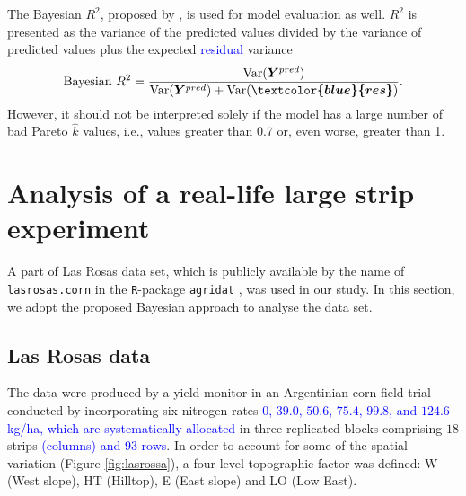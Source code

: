 \documentclass[a4paper]{article}   	%
\newcommand{\Var}{\mathrm{Var}}
\newcommand{\R}{\texttt{R}}
\begin{document}
	
	
	
	
	
	The Bayesian $R^2$, proposed by \textcite{Gelman2019Rsquared}, is used for model evaluation as well. $R^2$ is presented as the variance of the predicted values divided by the variance of predicted values plus the expected \textcolor{blue}{residual} variance 
	\begin{eqnarray}
		\mbox{Bayesian } R^2 = \frac{\Var(\bm{Y}^{pred})}{\Var (\bm{Y}^{pred})+\Var(\bm{\textcolor{blue}{res}})}.
	\end{eqnarray}
	However, it should not be interpreted solely if the model has a large number of bad Pareto $\hat{k}$ values, i.e., values greater than 0.7 or, even worse, greater than 1. 
	
	
	
	\section{Analysis of a real-life large strip experiment}\label{sec:analysis}
	
	A part of Las Rosas data set, which is publicly available by the name of \texttt{lasrosas.corn} in the \R-package \texttt{agridat} \parencite{Edmondson2014Agridat}, was used in our study. In this section, we adopt the proposed Bayesian approach to analyse the data set. 
	
	
	\subsection{Las Rosas data}
	
	The data were produced by a yield monitor in an Argentinian corn field trial conducted by incorporating six nitrogen rates \textcolor{blue}{$0$, $39.0$, $50.6$, $75.4$, $99.8$, and $124.6$ kg/ha, which are systematically allocated} in three replicated blocks comprising $18$ strips \textcolor{blue}{(columns) and 93 rows}. In order to account for some of the spatial variation (Figure \ref{fig:lasrossa}), a four-level topographic factor was defined: W (West slope), HT (Hilltop), E (East slope) and LO (Low East).  
	
\end{document}
